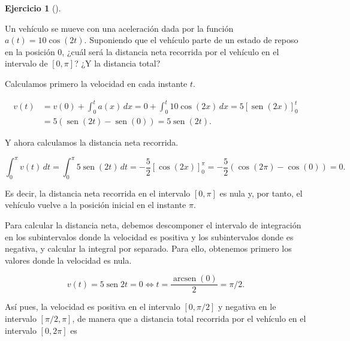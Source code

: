 \documentclass[
  spanish,
  a4paper,
]{scrreport}
\theoremstyle{definition}
\newtheorem{exercise}{Ejercicio}[chapter]
\theoremstyle{remark}
\begin{document}
\begin{exercise}[]\protect\hypertarget{exr-cinematica-2}{}\label{exr-cinematica-2}

Un vehículo se mueve con una aceleración dada por la función
\(a(t)=10\cos(2t)\). Suponiendo que el vehículo parte de un estado de
reposo en la posición \(0\), ¿cuál será la distancia neta recorrida por
el vehículo en el intervalo de \([0,\pi]\)? ¿Y la distancia total?

\end{exercise}

\begin{tcolorbox}[enhanced jigsaw, arc=.35mm, bottomrule=.15mm, bottomtitle=1mm, breakable, colback=white, colbacktitle=quarto-callout-tip-color!10!white, colframe=quarto-callout-tip-color-frame, coltitle=black, left=2mm, leftrule=.75mm, opacityback=0, opacitybacktitle=0.6, rightrule=.15mm, title=\textcolor{quarto-callout-tip-color}{\faLightbulb}\hspace{0.5em}{Solución}, titlerule=0mm, toprule=.15mm, toptitle=1mm]

Calculamos primero la velocidad en cada instante \(t\).

\begin{align*}
v(t) 
&= v(0) + \int_0^t a(x)\,dx 
= 0 + \int_0^t 10\cos(2x)\,dx 
= 5[\operatorname{sen}(2x)]_0^t \\
&= 5(\operatorname{sen}(2t) - \operatorname{sen}(0))
= 5 \operatorname{sen}(2t).
\end{align*}

Y ahora calculamos la distancia neta recorrida.

\[
\int_0^{\pi} v(t)\,dt 
= \int_0^{\pi} 5\operatorname{sen}(2t)\, dt 
= -\frac{5}{2}[\cos(2x)]_0^{\pi}
= -\frac{5}{2}(\cos(2\pi) - \cos(0))
= 0.
\]

Es decir, la distancia neta recorrida en el intervalo \([0,\pi]\) es
nula y, por tanto, el vehículo vuelve a la posición inicial en el
instante \(\pi\).

Para calcular la distancia neta, debemos descomponer el intervalo de
integración en los subintervalos donde la velocidad es positiva y los
subintervalos donde es negativa, y calcular la integral por separado.
Para ello, obtenemos primero los valores donde la velocidad es nula.

\[
v(t) = 5\operatorname{sen}{2t} = 0 \Leftrightarrow t = \frac{\operatorname{arcsen}(0)}{2} = \pi/2.
\]

Así pues, la velocidad es positiva en el intervalo \([0,\pi/2]\) y
negativa en le intervalo \([\pi/2, \pi]\), de manera que a distancia
total recorrida por el vehículo en el intervalo \([0,2\pi]\) es


\end{tcolorbox}
\end{document}
